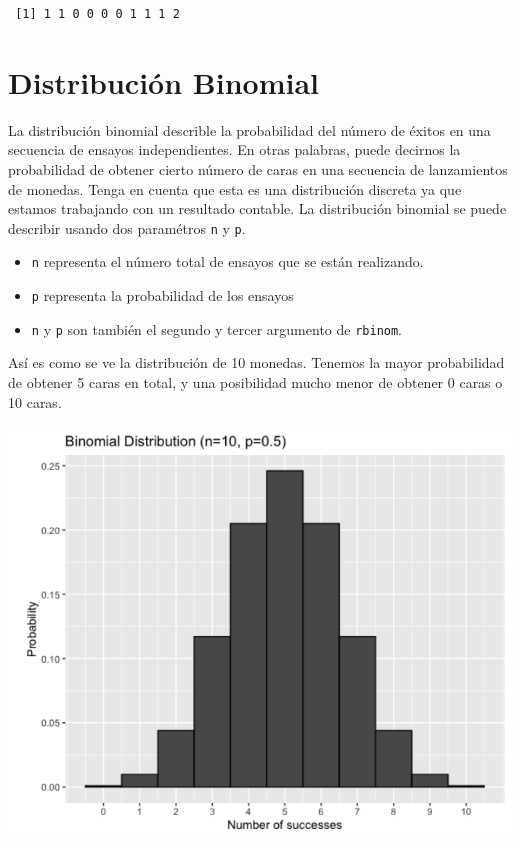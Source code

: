 \documentclass[
  letterpaper,
  DIV=11,
  numbers=noendperiod]{scrreprt}
\begin{document}
\begin{verbatim}
 [1] 1 1 0 0 0 0 1 1 1 2
\end{verbatim}

\hypertarget{distribuciuxf3n-binomial-1}{%
\section{Distribución Binomial}\label{distribuciuxf3n-binomial-1}}

La distribución binomial describle la probabilidad del número de éxitos
en una secuencia de ensayos independientes. En otras palabras, puede
decirnos la probabilidad de obtener cierto número de caras en una
secuencia de lanzamientos de monedas. Tenga en cuenta que esta es una
distribución discreta ya que estamos trabajando con un resultado
contable. La distribución binomial se puede describir usando dos
paramétros \texttt{n} y \texttt{p}.

\begin{itemize}
\item
  \texttt{n} representa el número total de ensayos que se están
  realizando.
\item
  \texttt{p} representa la probabilidad de los ensayos
\item
  \texttt{n} y \texttt{p} son también el segundo y tercer argumento de
  \texttt{rbinom}.
\end{itemize}

Así es como se ve la distribución de 10 monedas. Tenemos la mayor
probabilidad de obtener 5 caras en total, y una posibilidad mucho menor
de obtener 0 caras o 10 caras.

\includegraphics{fig43.png}
\end{document}
